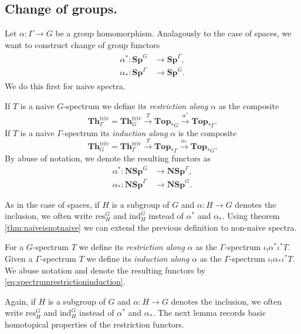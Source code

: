 \subsection{Change of groups.}
Let $\alpha:\Gamma\to G$ be a group homomorphism.
Analagously to the case of spaces, we want to construct change of group
functors
\begin{align}\label{eq:spectrumrestrictioninduction}
\begin{split}
\alpha^\ast:\mathbf{Sp}^G  &\to \mathbf{Sp}^\Gamma,\\
\alpha_\ast:\mathbf{Sp}^\Gamma  &\to \mathbf{Sp}^G.
\end{split}
\end{align}
We do this first for naive spectra.
\begin{mydef}
If $T$ is a naive $G$-spectrum we define its \textit{restriction along}
$\alpha$ as the composite
\[
\mathbf{Th}^{\mathrm{triv}}_\Gamma = \mathbf{Th}^{\mathrm{triv}}_G\xrightarrow{T}
\mathbf{Top}_{\ast G}\xrightarrow{\alpha^\ast}\mathbf{Top}_{\ast \Gamma}.
\]
If $T$ is a naive $\Gamma$-spectrum its \textit{induction along} $\alpha$ is the composite
\[
\mathbf{Th}^{\mathrm{triv}}_G = \mathbf{Th}^{\mathrm{triv}}_\Gamma\xrightarrow{T}
\mathbf{Top}_{\ast \Gamma}\xrightarrow{\alpha_\ast}\mathbf{Top}_{\ast G}.
\]
By abuse of notation, we denote the resulting functors as
\begin{align}
\alpha^\ast:\mathbf{NSp}^G  &\to \mathbf{NSp}^\Gamma,\\
\alpha_\ast:\mathbf{NSp}^\Gamma  &\to \mathbf{NSp}^G.
\end{align}
\end{mydef}
As in the case of spaces, if $H$ is a subgroup of $G$ and $\alpha:H\to G$ denotes the inclusion,
we often write $\mathrm{res}^G_H$ and $\mathrm{ind}^G_H$ instead of
$\alpha^\ast$ and $\alpha_\ast$.
Using theorem \ref{thm:naiveisnotnaive} we can extend the previous definition to non-naive
spectra.
\begin{mydef}
For a $G$-spectrum $T$ we define its \textit{restriction along} $\alpha$ as
the $\Gamma$-spectrum $\iota_!\alpha^\ast\iota^\ast T$.
Given a $\Gamma$-spectrum $T$ we define its \textit{induction along} $\alpha$ as
the $\Gamma$-spectrum $\iota_!\alpha_\ast\iota^\ast T$.
We abuse notation and denote the resulting functors by \eqref{eq:spectrumrestrictioninduction}.
\end{mydef}
Again, if $H$ is a subgroup of $G$ and $\alpha:H\to G$ denotes the inclusion,
we often write $\mathrm{res}^G_H$ and $\mathrm{ind}^G_H$ instead of
$\alpha^\ast$ and $\alpha_\ast$. The next lemma records basic
homotopical properties of the restriction functors.

